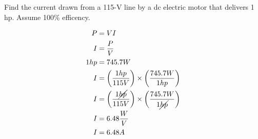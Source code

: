 Find the current drawn from a 115-V line by a dc electric motor that delivers 1 hp. Assume
100\% efficency. 

\begin{align*}
	P &= VI
	\\ I &= \frac{P}{V}
	\\ 1 hp &= 745.7 W
	\\ I &= \left( \frac{1 hp}{115 V} \right) \times \left( \frac{745.7 W}{1 hp} \right)	
	\\ I &= \left( \frac{1 \cancel{hp}}{115 V} \right) \times \left( \frac{745.7 W}{1 \cancel{hp}} \right)
	\\ I &= 6.48 \frac{W}{V}
	\\ I &= 6.48 A
\end{align*}
